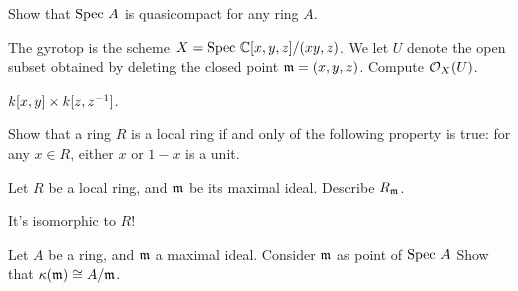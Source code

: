 \begin{dproblem}
	\gim
	Show that $\text{Spec } A$ is quasicompact for any ring $A$.
\end{dproblem}

\begin{problem}
	The gyrotop is the scheme $X = \text{Spec } \mathbb C[x,y,z] / (xy,z)$.
	We let $U$ denote the open subset obtained
	by deleting the closed point $\mathfrak m = (x,y,z)$.
	Compute $\mathcal O_X(U)$.
	\begin{hint}
		$k[x,y] \times k[z,z^{-1}]$.
	\end{hint}
\end{problem}

\begin{problem}
	Show that a ring $R$ is a local ring
	if and only of the following property is true:
	for any $x \in R$,
	either $x$ or $1-x$ is a unit.
\end{problem}

\begin{problem}
	Let $R$ be a local ring, and $\mathfrak m$ be its maximal ideal.
	Describe $R_\mathfrak m$.
	\begin{hint}
		It's isomorphic to $R$!
	\end{hint}
\end{problem}

\begin{problem}
	Let $A$ be a ring, and $\mathfrak m$ a maximal ideal.
	Consider $\mathfrak m$ as point of $\text{Spec } A$
	Show that $\kappa(\mathfrak m) \cong A/\mathfrak m$.
\end{problem}


